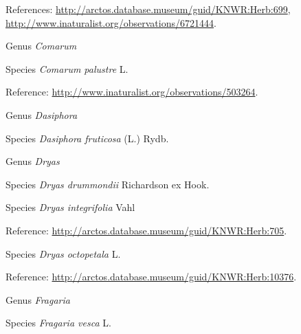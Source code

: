 \documentclass[9pt, article]{memoir}
\begin{document}
\begin{multicols}{2}
\vspace{6pt}References: 
\url{http://arctos.database.museum/guid/KNWR:Herb:699}, 
\url{http://www.inaturalist.org/observations/6721444}.

\vspace{6pt}\noindent\hspace{30pt}Genus \textit{Comarum}


\vspace{6pt}\noindent\hspace{36pt}Species \textit{Comarum palustre} L.


\vspace{6pt}Reference: 
\url{http://www.inaturalist.org/observations/503264}.

\vspace{6pt}\noindent\hspace{30pt}Genus \textit{Dasiphora}


\vspace{6pt}\noindent\hspace{36pt}Species \textit{Dasiphora fruticosa} (L.) Rydb.


\vspace{6pt}\noindent\hspace{30pt}Genus \textit{Dryas}


\vspace{6pt}\noindent\hspace{36pt}Species \textit{Dryas drummondii} Richardson ex Hook.


\vspace{6pt}\noindent\hspace{36pt}Species \textit{Dryas integrifolia} Vahl


\vspace{6pt}Reference: 
\url{http://arctos.database.museum/guid/KNWR:Herb:705}.

\vspace{6pt}\noindent\hspace{36pt}Species \textit{Dryas octopetala} L.


\vspace{6pt}Reference: 
\url{http://arctos.database.museum/guid/KNWR:Herb:10376}.

\vspace{6pt}\noindent\hspace{30pt}Genus \textit{Fragaria}


\vspace{6pt}\noindent\hspace{36pt}Species \textit{Fragaria vesca} L.



\end{multicols}
\end{document}
